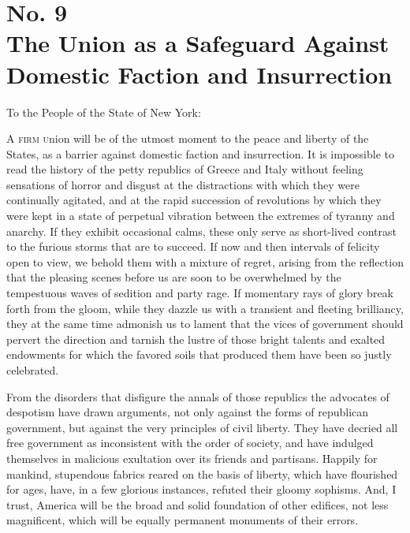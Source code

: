 \chapter[No. 9: The Union as a Safeguard Against Domestic Faction and Insurrection]{No. 9\\ {\small The Union as a Safeguard Against Domestic Faction and Insurrection}}
To the People of the State of New York:
\vspace{.25cm}

\textsc{A firm u}nion will be of the utmost moment to the peace and liberty of the States, as a barrier against domestic faction and insurrection. It is impossible to read the history of the petty republics of Greece and Italy without feeling sensations of horror and disgust at the distractions with which they were continually agitated, and at the rapid succession of revolutions by which they were kept in a state of perpetual vibration between the extremes of tyranny and anarchy. If they exhibit occasional calms, these only serve as short-lived contrast to the furious storms that are to succeed. If now and then intervals of felicity open to view, we behold them with a mixture of regret, arising from the reflection that the pleasing scenes before us are soon to be overwhelmed by the tempestuous waves of sedition and party rage. If momentary rays of glory break forth from the gloom, while they dazzle us with a transient and fleeting brilliancy, they at the same time admonish us to lament that the vices of government should pervert the direction and tarnish the lustre of those bright talents and exalted endowments for which the favored soils that produced them have been so justly celebrated.

From the disorders that disfigure the annals of those republics the advocates of despotism have drawn arguments, not only against the forms of republican government, but against the very principles of civil liberty. They have decried all free government as inconsistent with the order of society, and have indulged themselves in malicious exultation over its friends and partisans. Happily for mankind, stupendous fabrics reared on the basis of liberty, which have flourished for ages, have, in a few glorious instances, refuted their gloomy sophisms. And, I trust, America will be the broad and solid foundation of other edifices, not less magnificent, which will be equally permanent monuments of their errors.

